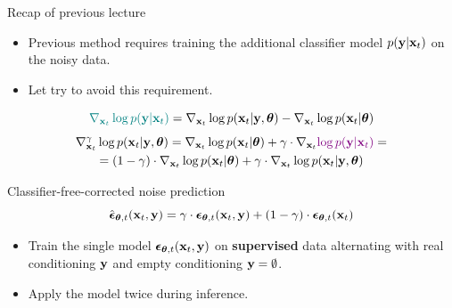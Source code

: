 \begin{frame}{Recap of previous lecture}
	\begin{itemize}
		\item Previous method requires training the additional classifier model $p(\mathbf{y} | \mathbf{x}_t)$ on the noisy data.	
		\item Let try to avoid this requirement.
	\end{itemize}
	\[
		{\color{teal}\nabla_{\mathbf{x}_t} \log p(\mathbf{y} | \mathbf{x}_t)} =  \nabla_{\mathbf{x}_t} \log p(\mathbf{x}_t| \mathbf{y}, \boldsymbol{\theta}) -\nabla_{\mathbf{x}_t} \log  p(\mathbf{x}_t | \boldsymbol{\theta})
	\]
	\vspace{-0.4cm}
	\begin{multline*}
		\nabla_{\mathbf{x}_t}^{\gamma} \log p(\mathbf{x}_t | \mathbf{y}, \boldsymbol{\theta}) = \nabla_{\mathbf{x}_t} \log p(\mathbf{x}_t | \boldsymbol{\theta}) + \gamma \cdot \nabla_{\mathbf{x}_t} {\color{violet}\log p(\mathbf{y} | \mathbf{x}_t)} = \\
		=  (1 - \gamma) \cdot  \nabla_{\mathbf{x}_t} \log p(\mathbf{x}_t | \boldsymbol{\theta}) + \gamma \cdot  \nabla_{\mathbf{x}_t} \log p(\mathbf{x}_t| \mathbf{y}, \boldsymbol{\theta})
	\end{multline*}
	\vspace{-0.4cm}
	\begin{block}{Classifier-free-corrected noise prediction}
		\vspace{-0.3cm}
		\[
			\hat{\boldsymbol{\epsilon}}_{\boldsymbol{\theta}, t}(\mathbf{x}_t, \mathbf{y}) = \gamma \cdot \boldsymbol{\epsilon}_{\boldsymbol{\theta}, t}(\mathbf{x}_t, \mathbf{y}) + (1 - \gamma) \cdot \boldsymbol{\epsilon}_{\boldsymbol{\theta}, t}(\mathbf{x}_t)
		\]
		\vspace{-0.5cm}
	\end{block}
	\begin{itemize}
		\item Train the single model $\boldsymbol{\epsilon}_{\boldsymbol{\theta}, t}(\mathbf{x}_t, \mathbf{y})$ on \textbf{supervised} data alternating with real conditioning $\mathbf{y}$ and empty conditioning $\mathbf{y} = \emptyset$.
		\item Apply the model twice during inference.
	\end{itemize}
\end{frame}
